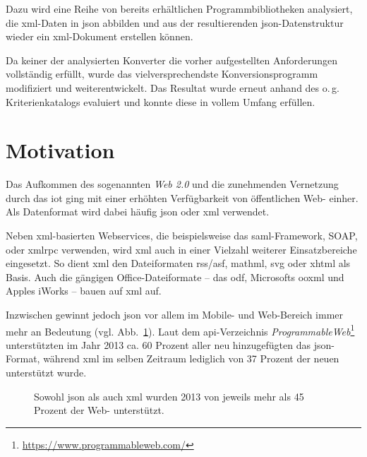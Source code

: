 Dazu wird eine Reihe von bereits erhältlichen Programmbibliotheken analysiert,
die \acrshort{xml}-Daten in \acrshort{json} abbilden und aus der resultierenden
\acrshort{json}-Datenstruktur wieder ein \acrshort{xml}-Dokument erstellen können.


Da keiner der analysierten Konverter die vorher aufgestellten Anforderungen
vollständig erfüllt, wurde das vielversprechendste Konversionsprogramm
modifiziert und weiterentwickelt. Das Resultat wurde erneut anhand des o.\,g.
Kriterienkatalogs evaluiert und konnte diese in vollem Umfang erfüllen.

\section{Motivation}
\label{sec:motivation}
Das Aufkommen des sogenannten \emph{Web 2.0} und die zunehmenden Vernetzung
durch das \gls{iot} ging mit einer erhöhten
Verfügbarkeit von öffentlichen Web- einher. Als Datenformat wird dabei
häufig \acrshort{json} oder \acrshort{xml} verwendet.

Neben \acrshort{xml}-basierten Webservices, die beispielsweise das \acrshort{saml}-Framework, SOAP,
oder \gls{xmlrpc} verwenden, wird \acrshort{xml} auch in einer Vielzahl weiterer
Einsatzbereiche eingesetzt. So dient \acrshort{xml} den Dateiformaten \acrshort{rss}/\acrshort{asf}, \acrshort{mathml},
\gls{svg} oder \gls{xhtml} als Basis. Auch die gängigen
Office-Dateiformate -- das \acrfull{odf}, Microsofts %
\acrfull{ooxml} und Apples iWorks -- bauen auf \acrshort{xml} auf. %

Inzwischen gewinnt jedoch \acrshort{json} vor allem im Mobile-
und Web-Bereich immer mehr an Bedeutung (vgl. Abb.~\ref{fig:xmljsonapis}). Laut dem \acrshort{api}-Verzeichnis
\emph{ProgrammableWeb}\footnote{\url{https://www.programmableweb.com/}} unterstützten im Jahr 2013 ca. 60 Prozent aller neu
hinzugefügten  das \acrshort{json}-Format, während
\acrshort{xml} im selben Zeitraum lediglich von 37 Prozent der neuen 
unterstützt wurde.~\cite{duvander2013convergence}

\begin{figure}[h!]
    \begin{center}
        
    \end{center}
    \caption{Sowohl \acrshort{json} als auch \acrshort{xml} wurden 2013 von jeweils mehr als 45 Prozent der Web- unterstützt.}
    \label{fig:xmljsonapis}
\end{figure}


